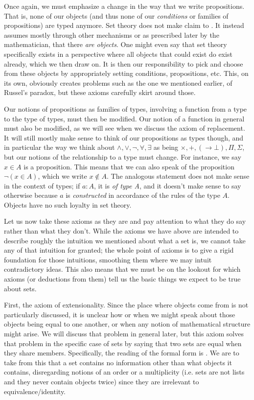\documentclass[11pt]{article}
\begin{document}
Once again, we must emphasize a change in the way that we write propositions. That is, none of our objects (and thus none of our \emph{conditions} or families of propositions) are typed anymore. Set theory does not make claim to . It instead assumes mostly through other mechanisms or as prescribed later by the mathematician, that there \emph{are objects}. One might even say that set theory specifically exists in a perspective where all objects that could exist do exist already, which we then draw on. It is then our responsibility to pick and choose from these objects by appropriately setting conditions, propositions, etc. This, on its own, obviously creates problems such as the one we mentioned earlier, of Russel's paradox, but these axioms carefully skirt around those. 

Our notions of propositions as families of types, involving a function from a type to the type of types, must then be modified. Our notion of a function in general must also be modified, as we will see when we discuss the axiom of replacement. It will still mostly make sense to think of our propositions as types though, and in particular the way we think about $\wedge,\vee,\neg, \forall, \exists$ as being $\times,+,(\to \bot), \Pi, \Sigma$, but our notions of the relationship to a type must change. For instance, we say $x \in A$ is a proposition. This means that we can also speak of the proposition $\neg (x \in A)$, which we write $x \notin A$. The analogous statement does not make sense in the context of types; if $a \colon A$, it is \emph{of type A}, and it doesn't make sense to say otherwise because $a$ is \emph{constructed} in accordance of the rules of the type $A$. Objects have no such loyalty in set theory. 

Let us now take these axioms as they are and pay attention to what they do say rather than what they don't. While the axioms we have above are intended to describe roughly the intuition we mentioned about what a set is, we cannot take any of that intuition for granted; the whole point of axioms is to give a rigid foundation for those intuitions, smoothing them where we may intuit contradictory ideas. This also means that we must be on the lookout for which axioms (or deductions from them) tell us the basic things we expect to be true about sets.

First, the axiom of extensionality. Since the place where objects come from is not particularly discussed, it is unclear how or when we might speak about those objects being equal to one another, or when any notion of mathematical structure might arise. We will discuss that problem in general later, but this axiom solves that problem in the specific case of sets by saying that two sets are equal when they share members. Specifically, the reading of the formal form is . We are to take from this that a set contains no information other than what objects it contains, disregarding notions of an order or a multiplicity (i.e. sets are not lists and they never contain objects twice) since they are irrelevant to equivalence/identity.
\end{document}
